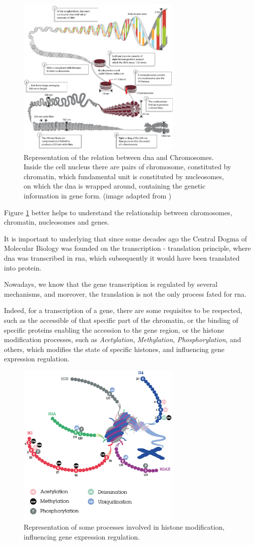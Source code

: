 \begin{figure}[h]
\centering
\includegraphics[width=8cm, keepaspectratio]{img/intro/dna2.jpg}
\caption[Chromosomes and \gls{dna}]{Representation of the relation between \gls{dna} and Chromosomes.
Inside the cell nucleus there are pairs of chromosome, constituted by chromatin, which fundamental unit is constituted by nucleosomes, on which the \gls{dna} is wrapped around, containing the genetic information in gene form. (image adapted from \cite{Annunziato2008})}
\label{fig:dnachromosome}
\end{figure}

Figure \ref{fig:dnachromosome} better helps  to understand the relationship between chromosomes, chromatin, nucleosomes and genes.

It is important to underlying that since some decades ago the Central Dogma of Molecular Biology was founded on the transcription - translation principle, where \gls{dna} was transcribed in \gls{rna}, which subsequently it would have been translated into protein.

Nowadays, we know that the gene transcription is regulated by several mechanisms, and moreover, the translation is not the only process fated for \gls{rna}.

Indeed, for a transcription of a gene, there are some requisites to be respected, such as the accessible of that specific part of the chromatin, or the binding of specific proteins enabling the accession to the gene region, or the histone modification processes, such as \textit{Acetylation}, \textit{Methylation}, \textit{Phosphorylation}, and others, which modifies the state of specific histones, and influencing gene expression regulation. 
  
\begin{figure}[h]
\centering
\includegraphics[width=8cm, keepaspectratio]{img/intro/hm.png}
\caption[Histon modification]{Representation of some processes involved in histone modification, influencing gene expression regulation.}
\label{fig:histmod}
\end{figure}
